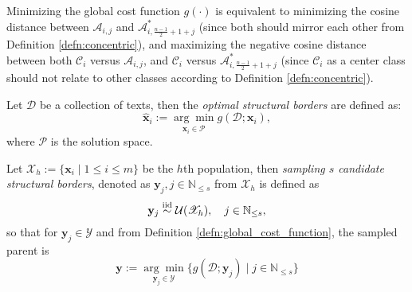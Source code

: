 \begin{remark}
    Minimizing the global cost function $g(\cdot)$ is equivalent to minimizing the cosine distance between $\mathscr{A}_{i,j}$ and $\mathscr{A}_{i,\frac{n-1}{2}+1+j}^{*}$ (since both should mirror each other from Definition \ref{defn:concentric}), and maximizing the negative cosine distance between both $\mathscr{C}_i$ versus $\mathscr{A}_{i,j}$, and $\mathscr{C}_i$ versus $\mathscr{A}_{i,\frac{n-1}{2}+1+j}^{*}$ (since $\mathscr{C}_i$ as a center class should not relate to other classes according to Definition \ref{defn:concentric}).
\end{remark}

\begin{defn}\label{defn:optimal_structural_borders}
    Let $\mathscr{D}$ be a collection of texts, then the \textit{optimal structural borders} are defined as:
    \begin{equation}
        \hat{\mathbf{x}}_{i}:=\underset{\mathbf{x}_i\in\mathscr{P}}{\arg\min}g(\mathscr{D};\mathbf{x}_i),
    \end{equation}
    where $\mathscr{P}$ is the solution space.
\end{defn}

\begin{defn}\label{defn:sampling_parents}
    Let $\mathscr{X}_h:=\{\mathbf{x}_{i}\mid 1\leq i\leq m\}$ be the $h$th population, then \textit{sampling $s$ candidate structural borders}, denoted as $\mathbf{y}_j, j \in\mathbb{N}_{\leq s}$ from $\mathscr{X}_h$ is defined as
    \begin{equation}
        \mathbf{y}_j\overset{\textnormal{iid}}{\sim}\mathcal{U}(\mathscr{X}_h),\quad j\in\mathbb{N}_{\leq s},
    \end{equation}
    so that for $\mathbf{y}_j\in\mathscr{Y}$ and from Definition \ref{defn:global_cost_function}, the sampled parent is
    \begin{equation}
        \mathbf{y}:=\underset{\mathbf{y}_j\in\mathscr{Y}}{\arg\min}\{g(\mathscr{D};\mathbf{y}_j)\mid j \in\mathbb{N}_{\leq s}\}
    \end{equation}
\end{defn}

